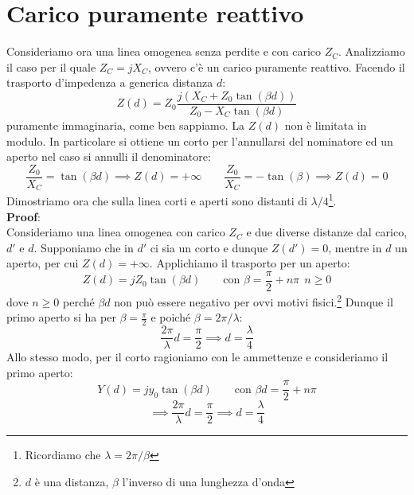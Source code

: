 \documentclass{book}
\begin{document}
    \section*{Carico puramente reattivo}
    Consideriamo ora una linea omogenea senza perdite e con carico $Z_{C}$. Analizziamo il caso per il quale $Z_{C}=jX_{C}$, ovvero c'è 
    un carico puramente reattivo. Facendo il trasporto d'impedenza a generica distanza $d$:
    \begin{equation}
        Z(d) = Z_{0} \frac{j(X_{C}+Z_{0}\tan(\beta d))}{Z_{0}-X_{C}\tan(\beta d)}
    \end{equation}
    puramente immaginaria, come ben sappiamo. La $Z(d)$ non è limitata in modulo. In particolare si ottiene 
    un corto per l'annullarsi del nominatore ed un aperto nel caso si annulli il denominatore:
    \begin{equation}
        \frac{Z_{0}}{X_{C}} = \tan(\beta d) \implies Z(d) = + \infty \qquad \frac{Z_{0}}{X_{C}}=-\tan(\beta) \implies Z(d) = 0
    \end{equation}
    Dimostriamo ora che sulla linea corti e aperti sono distanti di $\lambda/4$\footnote{Ricordiamo che $\lambda = 2\pi/\beta$}.\\
    \textbf{Proof}: \\
    Consideriamo una linea omogenea con carico $Z_{C}$ e due diverse distanze dal carico, $d'$ e $d$. Supponiamo che in $d'$ ci sia un corto 
    e dunque $Z(d')=0$, mentre in $d$ un aperto, per cui $Z(d)=+\infty$. Applichiamo il trasporto per un aperto:
    \begin{equation}
        Z(d)=jZ_{0}\tan(\beta d) \qquad \textrm{con } \beta = \frac{\pi}{2}+n \pi \ \ n \geq 0
    \end{equation}
    dove $n\geq 0$ perché $\beta d$ non può essere negativo per ovvi motivi fisici.\footnote{$d$ è una distanza, $\beta$ l'inverso di una lunghezza d'onda}
    Dunque il primo aperto si ha per $\beta = \frac{\pi}{2}$ e poiché $\beta = 2\pi/\lambda$:
    \begin{equation}
        \frac{2\pi}{\lambda}d = \frac{\pi}{2} \implies d = \frac{\lambda}{4}
    \end{equation}
    Allo stesso modo, per il corto ragioniamo con le ammettenze e consideriamo il primo aperto:
    \begin{equation}
        Y(d) = j y_{0}\tan(\beta d) \qquad \textrm{con } \beta d = \frac{\pi}{2}+n \pi
    \end{equation}
    \begin{equation}
        \implies \frac{2 \pi}{\lambda} d = \frac{\pi}{2} \implies d = \frac{\lambda}{4}
    \end{equation}
\end{document}
